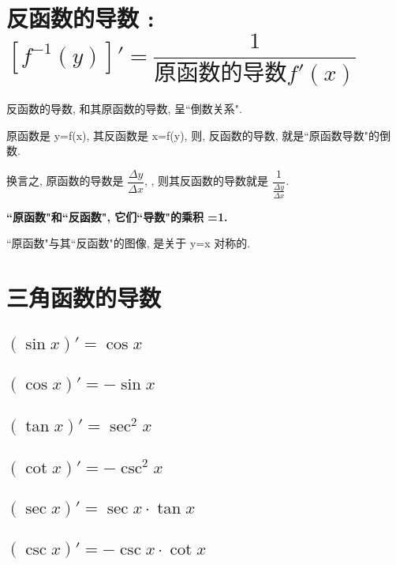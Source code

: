\documentclass[UTF8]{ctexart}
\begin{document}
\section{反函数的导数 : $[f^{-1}(y)]' = \dfrac{1} {\text{原函数的导数} f'(x)}$}


反函数的导数, 和其原函数的导数, 呈``倒数关系". 

原函数是 y=f(x), 其反函数是 x=f(y), 则, 反函数的导数, 就是``原函数导数"的倒数. 


换言之, 原函数的导数是 $\dfrac{\varDelta y}{\varDelta x} $, , 则其反函数的导数就是  $\dfrac{1}{\frac{\varDelta y}{\varDelta x}}$.

\textbf{``原函数"和``反函数", 它们``导数"的乘积 =1.}

``原函数"与其``反函数"的图像, 是关于 y=x 对称的.




\section{三角函数的导数}

\subsection{$(\sin x)' = \cos x$}

\subsection{$(\cos x)' = -\sin x$}

\subsection{$(\tan x)' = \sec^2 x$}

\subsection{$(\cot x)' = -\csc^2 x$}

\subsection{$(\sec x)' = \sec x  \cdot \tan x$}

\subsection{ $(\csc x)' = - \csc x \cdot \cot x$}
\end{document}
